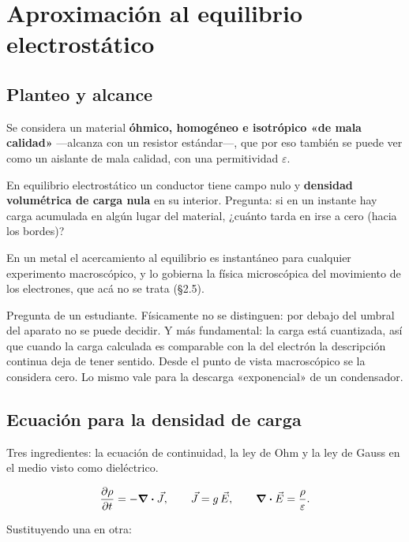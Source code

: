 \documentclass[12pt,a4paper]{article}
\begin{document}
\section{Aproximación al equilibrio electrostático}

\subsection{Planteo y alcance}

Se considera un material \textbf{óhmico, homogéneo e isotrópico «de mala calidad»}
---alcanza con un resistor estándar---, que por eso también se puede ver como un
aislante de mala calidad, con una permitividad $\varepsilon$.

En equilibrio electrostático un conductor tiene campo nulo y \textbf{densidad
volumétrica de carga nula} en su interior. Pregunta: si en un instante hay
carga acumulada en algún lugar del material, ¿cuánto tarda en irse a cero
(hacia los bordes)?

\begin{warnbox}
En un metal el acercamiento
al equilibrio es instantáneo para cualquier experimento macroscópico, y lo
gobierna la física microscópica del movimiento de los electrones, que acá no
se trata (§2.5).
\end{warnbox}

\begin{notebox}
Pregunta de un estudiante. Físicamente no
se distinguen: por debajo del umbral del aparato no se puede decidir. Y más
fundamental: la carga está cuantizada, así que cuando la carga calculada es
comparable con la del electrón la descripción continua deja de tener sentido.
Desde el punto de vista macroscópico se la considera cero. Lo mismo vale para
la descarga «exponencial» de un condensador.
\end{notebox}

\subsection{Ecuación para la densidad de carga}

Tres ingredientes: la ecuación de continuidad, la ley de Ohm y la ley de Gauss
en el medio visto como dieléctrico.

\[
\pdv{\rho}{t} = -\div \vec J,
\qquad \vec J = g\,\vec E,
\qquad \div \vec E = \frac{\rho}{\varepsilon} .
\]

Sustituyendo una en otra:
\end{document}
